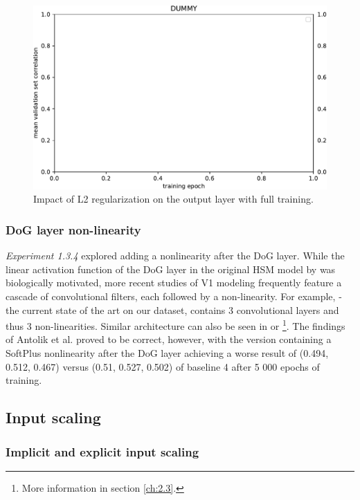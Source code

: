\begin{figure}[H]
    \centering
    \includegraphics[width=1\textwidth]{../figures/05_dummy}
    \caption[Experiment 5.1.3.3]{Impact of L2 regularization on the output layer with full training.}
    \label{fig:5.1.3.3}
\end{figure}

\subsubsection{DoG layer non-linearity}\label{ex:1.3.4}

\textit{Experiment 1.3.4} explored adding a nonlinearity after the DoG layer. While the linear activation function of the DoG layer in the original HSM model by \cite{antolik} was biologically motivated, more recent studies of V1 modeling frequently feature a cascade of convolutional filters, each followed by a non-linearity. For example, \cite{klidnt} - the current state of the art on our dataset, contains 3 convolutional layers and thus 3 non-linearities. Similar architecture can also be seen in \cite{ecker} or \cite{Walke506956}\footnote{More information in section \ref{ch:2.3}.}. The findings of Antolik et al. proved to be correct, however, with the version containing a SoftPlus nonlinearity after the DoG layer achieving a worse result of (0.494, 0.512, 0.467) versus (0.51, 0.527, 0.502) of baseline 4 after 5 000 epochs of training.

\subsection{Input scaling}
\subsubsection{Implicit and explicit input scaling}

